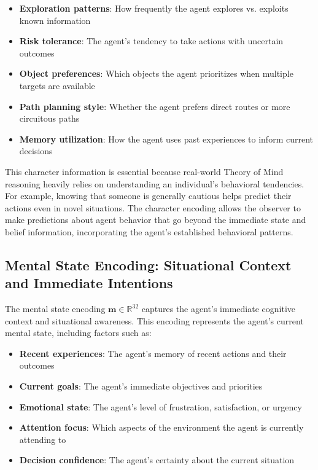 \documentclass[11pt]{article}
\begin{document}
\begin{itemize}
    \item \textbf{Exploration patterns}: How frequently the agent explores vs. exploits known information
    \item \textbf{Risk tolerance}: The agent's tendency to take actions with uncertain outcomes
    \item \textbf{Object preferences}: Which objects the agent prioritizes when multiple targets are available
    \item \textbf{Path planning style}: Whether the agent prefers direct routes or more circuitous paths
    \item \textbf{Memory utilization}: How the agent uses past experiences to inform current decisions
\end{itemize}

This character information is essential because real-world Theory of Mind reasoning heavily relies on understanding an individual's behavioral tendencies. For example, knowing that someone is generally cautious helps predict their actions even in novel situations. The character encoding allows the observer to make predictions about agent behavior that go beyond the immediate state and belief information, incorporating the agent's established behavioral patterns.

\subsection{Mental State Encoding: Situational Context and Immediate Intentions}

The mental state encoding $\mathbf{m} \in \mathbb{R}^{32}$ captures the agent's immediate cognitive context and situational awareness. This encoding represents the agent's current mental state, including factors such as:

\begin{itemize}
    \item \textbf{Recent experiences}: The agent's memory of recent actions and their outcomes
    \item \textbf{Current goals}: The agent's immediate objectives and priorities
    \item \textbf{Emotional state}: The agent's level of frustration, satisfaction, or urgency
    \item \textbf{Attention focus}: Which aspects of the environment the agent is currently attending to
    \item \textbf{Decision confidence}: The agent's certainty about the current situation
\end{itemize}
\end{document}
